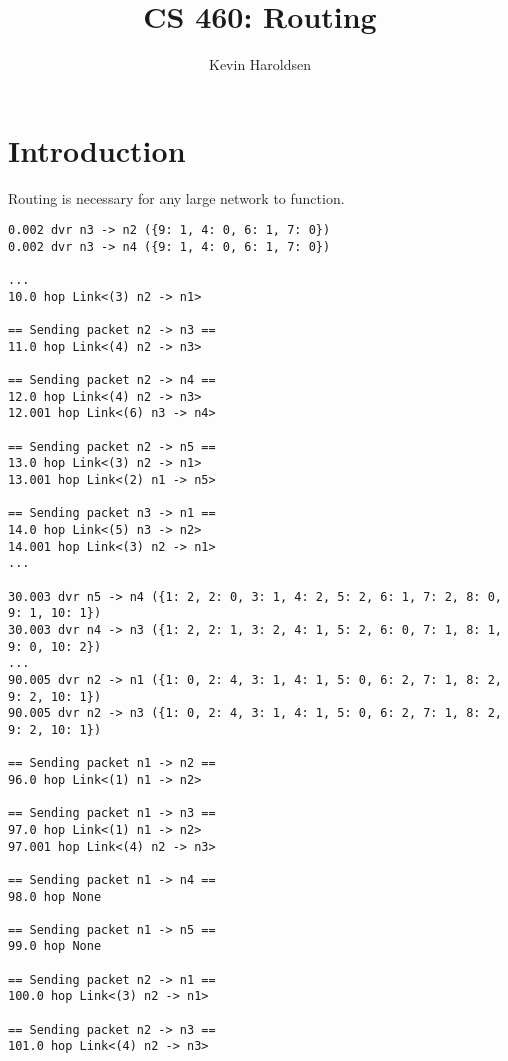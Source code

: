 \documentclass[fleqn,11pt]{article}
\title{CS 460: Routing}
\author{Kevin Haroldsen}
\date{}
\begin{document}
\maketitle

\section{Introduction}
Routing is necessary for any large network to function.

\begin{verbatim}
0.002 dvr n3 -> n2 ({9: 1, 4: 0, 6: 1, 7: 0})
0.002 dvr n3 -> n4 ({9: 1, 4: 0, 6: 1, 7: 0})
                                        
...
10.0 hop Link<(3) n2 -> n1>
                                        
== Sending packet n2 -> n3 ==
11.0 hop Link<(4) n2 -> n3>
                                        
== Sending packet n2 -> n4 ==
12.0 hop Link<(4) n2 -> n3>
12.001 hop Link<(6) n3 -> n4>
                                        
== Sending packet n2 -> n5 ==
13.0 hop Link<(3) n2 -> n1>
13.001 hop Link<(2) n1 -> n5>
                                        
== Sending packet n3 -> n1 ==
14.0 hop Link<(5) n3 -> n2>
14.001 hop Link<(3) n2 -> n1>
...

30.003 dvr n5 -> n4 ({1: 2, 2: 0, 3: 1, 4: 2, 5: 2, 6: 1, 7: 2, 8: 0, 9: 1, 10: 1})
30.003 dvr n4 -> n3 ({1: 2, 2: 1, 3: 2, 4: 1, 5: 2, 6: 0, 7: 1, 8: 1, 9: 0, 10: 2})
...
90.005 dvr n2 -> n1 ({1: 0, 2: 4, 3: 1, 4: 1, 5: 0, 6: 2, 7: 1, 8: 2, 9: 2, 10: 1})
90.005 dvr n2 -> n3 ({1: 0, 2: 4, 3: 1, 4: 1, 5: 0, 6: 2, 7: 1, 8: 2, 9: 2, 10: 1})
                                        
== Sending packet n1 -> n2 ==
96.0 hop Link<(1) n1 -> n2>
                                        
== Sending packet n1 -> n3 ==
97.0 hop Link<(1) n1 -> n2>
97.001 hop Link<(4) n2 -> n3>
                                        
== Sending packet n1 -> n4 ==
98.0 hop None
                                        
== Sending packet n1 -> n5 ==
99.0 hop None
                                        
== Sending packet n2 -> n1 ==
100.0 hop Link<(3) n2 -> n1>
                                        
== Sending packet n2 -> n3 ==
101.0 hop Link<(4) n2 -> n3>
                                        

\end{verbatim}
\end{document}
